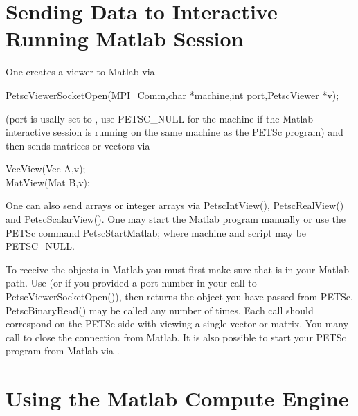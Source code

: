 \section{Sending Data to Interactive Running Matlab Session}

One creates a viewer to Matlab via 
\begin{tabbing}
PetscViewerSocketOpen(MPI\_Comm,char *machine,int port,PetscViewer *v);
\end{tabbing}
(port is usally set to , use PETSC_NULL for the machine if the 
Matlab interactive session is running on the same machine as the PETSc program) 
and then sends matrices or vectors via
\begin{tabbing}
  VecView(Vec A,v);\\
  MatView(Mat B,v);
\end{tabbing}
One can also send arrays or integer arrays via PetscIntView(), PetscRealView() and PetscScalarView().
One may start the Matlab program manually or use the PETSc command
PetscStartMatlab; where machine and script may be PETSC_NULL.

To receive the objects in Matlab you must first make sure that 
is in your Matlab path. Use  (or  if you provided a port number in
your call to PetscViewerSocketOpen()), then  returns the object you have passed from PETSc.
PetscBinaryRead() may be called any number of times. Each call should correspond on the PETSc side with
viewing a single vector or matrix. You many call  to close the connection from Matlab.
It is also possible to start your PETSc program from Matlab via .

\section{Using the Matlab Compute Engine}

